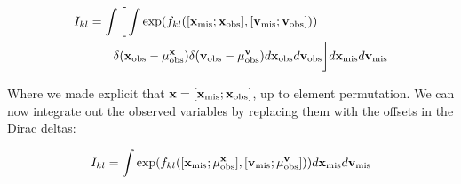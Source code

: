 \documentclass[letterpaper]{article}
\newcommand{\vx}{{\bf x}}
\newcommand{\vv}{{\bf v}}
\begin{document}
\begin{equation*}
  \begin{aligned}
    I_{kl} &= \int \bigg[ \int \exp( f_{kl}([\vx_\text{mis}; \vx_\text{obs}], [\vv_\text{mis}; \vv_\text{obs}]) ) \\
    & \hspace{2em} \delta(\vx_\text{obs}-\mu^\vx_\text{obs}) \delta(\vv_\text{obs}-\mu^\vv_\text{obs}) d\vx_\text{obs} d\vv_\text{obs} \bigg] d\vx_\text{mis}d\vv_\text{mis}
  \end{aligned}
\end{equation*}

Where we made explicit that $\vx = [\vx_\text{mis}; \vx_\text{obs}]$, up to
element permutation.
We can now integrate out the observed variables by replacing them with the
offsets in the Dirac deltas:

\begin{equation*}
  I_{kl} = \int \exp( f_{kl}([\vx_\text{mis}; \mu^\vx_\text{obs}], [\vv_\text{mis}; \mu^\vv_\text{obs}]) ) d\vx_\text{mis}d\vv_\text{mis}
\end{equation*}
\end{document}

